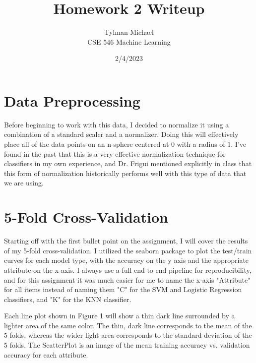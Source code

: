 \documentclass[12pt]{article}
\title{Homework 2 Writeup}
\author{Tylman Michael\\CSE 546 Machine Learning}
\date{2/4/2023}
\begin{document}
\maketitle{}
\section{Data Preprocessing}
Before beginning to work with this data, I decided to normalize it using a combination of a standard scaler and a normalizer. 
Doing this will effectively place all of the data points on an n-sphere centered at 0 with a radius of 1. I've found in the past
that this is a very effective normalization technique for classifiers in my own experience, and Dr. Frigui mentioned explicitly 
in class that this form of normalization historically performs well with this type of data that we are using.

\section{5-Fold Cross-Validation}

Starting off with the first bullet point on the assignment, I will cover the results of my 5-fold cross-validation. 
I utilized the seaborn package to plot the test/train curves for each model type, with the accuracy on the y axis and 
the appropriate attribute on the x-axis. I always use a full end-to-end pipeline for reproducibility, and for this assignment
it was much easier for me to name the x-axis "Attribute" for all items instead of naming them "C" for the SVM and Logistic
Regression classifiers, and "K" for the KNN classifier.

Each line plot shown in Figure 1 will show a thin dark line surrounded by a lighter area of the same color. The thin, dark line corresponds to 
the mean of the 5 folds, whereas the wider light area corresponds to the standard deviation of the 5 folds. The ScatterPlot
is an image of the mean training accuracy vs. validation accuracy for each attribute.
\end{document}
